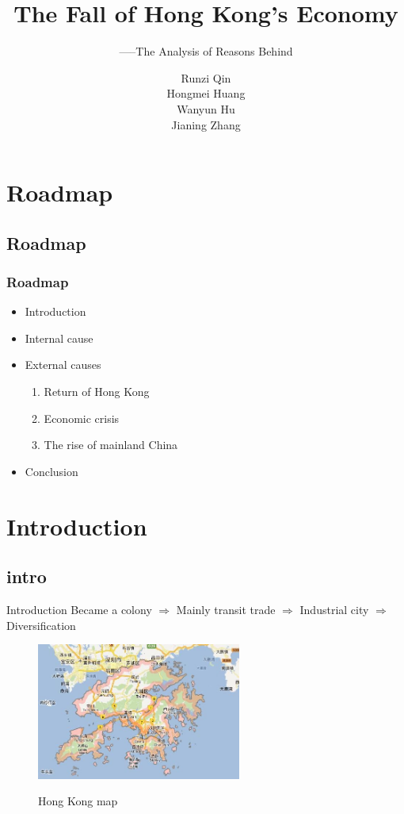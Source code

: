 \documentclass[slidestop,uncompress,mathsans, 12pt]{beamer}
\begin{document}
\begin{frame}
\title{The Fall of Hong Kong's Economy}
\subtitle{-----The Analysis of Reasons Behind}
\author{Runzi Qin\\   Hongmei Huang\\   Wanyun Hu\\ Jianing Zhang}
\titlepage
\end{frame}

\section{Roadmap}
\subsection{Roadmap}
\begin{frame}
\frametitle{Roadmap}
\begin{itemize}
\item Introduction
\item Internal cause
\item External causes
\begin{enumerate}
\item  Return of Hong Kong
\item  Economic crisis
\item  The rise of mainland China
\end{enumerate}

\item  Conclusion
\end{itemize}
\end{frame}
\section{Introduction}
\subsection{intro}
\begin{frame}{Introduction}
Became a colony $\Longrightarrow$
 Mainly transit trade $\Longrightarrow$
 Industrial city $\Longrightarrow$
 Diversification\\
\bigskip
\begin{figure}[h]
\centering
\includegraphics[width=0.6\textwidth]{hk16.jpg}
\label{threadsVsSync}
\caption{Hong Kong map}
\end{figure}
\end{frame}
\end{document}
